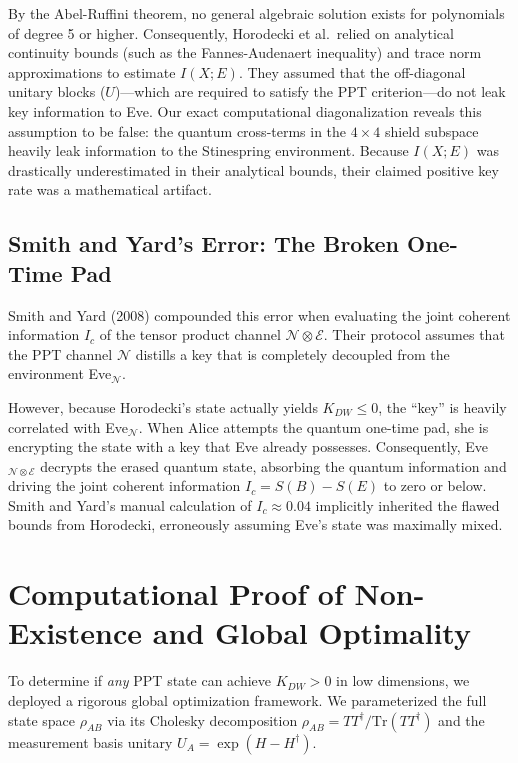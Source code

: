 \documentclass[twocolumn,prl,aps,superscriptaddress,floatfix]{revtex4-2}
\begin{document}
By the Abel-Ruffini theorem, no general algebraic solution exists for polynomials of degree 5 or higher. Consequently, Horodecki et al.\ relied on analytical continuity bounds (such as the Fannes-Audenaert inequality) and trace norm approximations to estimate $I(X;E)$. They assumed that the off-diagonal unitary blocks ($U$)---which are required to satisfy the PPT criterion---do not leak key information to Eve. Our exact computational diagonalization reveals this assumption to be false: the quantum cross-terms in the $4 \times 4$ shield subspace heavily leak information to the Stinespring environment. Because $I(X;E)$ was drastically underestimated in their analytical bounds, their claimed positive key rate was a mathematical artifact.

\subsection{Smith and Yard's Error: The Broken One-Time Pad}
Smith and Yard (2008) compounded this error when evaluating the joint coherent information $I_c$ of the tensor product channel $\mathcal{N} \otimes \mathcal{E}$. Their protocol assumes that the PPT channel $\mathcal{N}$ distills a key that is completely decoupled from the environment Eve$_\mathcal{N}$. 

However, because Horodecki's state actually yields $K_{DW} \le 0$, the ``key'' is heavily correlated with Eve$_\mathcal{N}$. When Alice attempts the quantum one-time pad, she is encrypting the state with a key that Eve already possesses. Consequently, Eve$_{\mathcal{N} \otimes \mathcal{E}}$ decrypts the erased quantum state, absorbing the quantum information and driving the joint coherent information $I_c = S(B) - S(E)$ to zero or below. Smith and Yard's manual calculation of $I_c \approx 0.04$ implicitly inherited the flawed bounds from Horodecki, erroneously assuming Eve's state was maximally mixed.

\section{Computational Proof of Non-Existence and Global Optimality}

To determine if \emph{any} PPT state can achieve $K_{DW} > 0$ in low dimensions, we deployed a rigorous global optimization framework. We parameterized the full state space $\rho_{AB}$ via its Cholesky decomposition $\rho_{AB} = T T^\dagger / \text{Tr}(T T^\dagger)$ and the measurement basis unitary $U_A = \exp(H - H^\dagger)$. 
\end{document}
